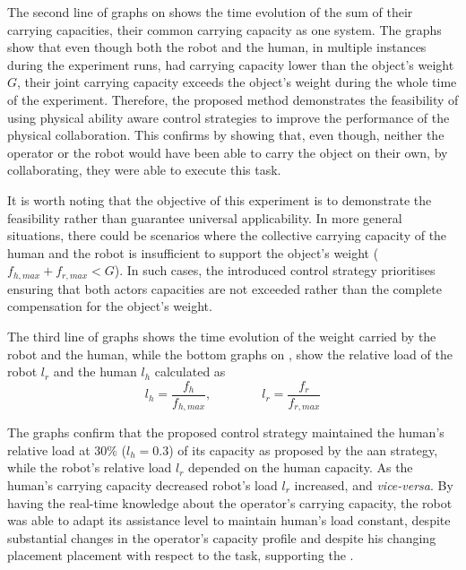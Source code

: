 The second line of graphs on  shows the time evolution of the sum of their carrying capacities, their common carrying capacity as one system. The graphs show that even though both the robot and the human, in multiple instances during the experiment runs, had carrying capacity lower than the object's weight $G$, their joint carrying capacity exceeds the object's weight during the whole time of the experiment. Therefore, the proposed method demonstrates the feasibility of using physical ability aware control strategies to improve the performance of the physical collaboration. This confirms  by showing that, even though, neither the operator or the robot would have been able to carry the object on their own, by collaborating, they were able to execute this task.

It is worth noting that the objective of this experiment is to demonstrate the feasibility rather than guarantee universal applicability. In more general situations, there could be scenarios where the collective carrying capacity of the human and the robot is insufficient to support the object's weight ($f_{h,max}+f_{r,max} <G$). In such cases, the introduced control strategy prioritises ensuring that both actors capacities are not exceeded rather than the complete compensation for the object's weight.

The third line of graphs shows the time evolution of the weight carried by the robot and the human, while the bottom graphs on , show the relative load of the robot $l_r$ and the human $l_h$ calculated as
$$
l_h = \frac{f_h}{f_{h,max}}, \qquad\qquad l_r = \frac{f_r}{f_{r,max}}
$$

The graphs confirm that the proposed control strategy maintained the human's relative load at 30\% ($l_h=0.3$) of its capacity as proposed by the \gls{aan} strategy, while the robot's relative load $l_r$ depended on the human capacity. As the human's carrying capacity decreased robot's load $l_r$ increased, and \textit{vice-versa}. By having the real-time knowledge about the operator's carrying capacity, the robot was able to adapt its assistance level to maintain human's load constant, despite substantial changes in the operator's capacity profile and despite his changing placement placement with respect to the task, supporting the .


